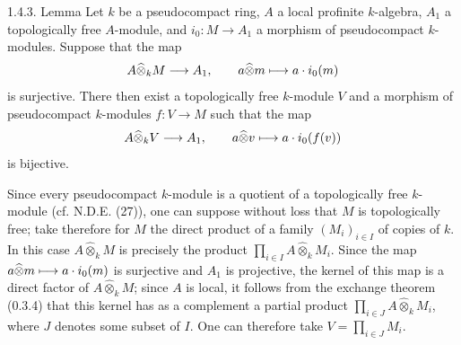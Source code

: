 \begin{enonce}{1.4.3. Lemma}{}\label{VIIB.1.4.3}
Let $k$ be a pseudocompact ring, $A$ a local profinite $k$-algebra, $A_1$ a topologically free $A$-module, and $i_0:M\to A_1$ a morphism of pseudocompact $k$-modules. Suppose that the map
\[
A\widehat\otimes_k M\longrightarrow A_1,\qquad a\widehat\otimes m\longmapsto a\cdot i_0(m)
\]
is surjective. There then exist a topologically free $k$-module $V$ and a morphism of pseudocompact $k$-modules $f:V\to M$ such that the map
\[
A\widehat\otimes_k V\longrightarrow A_1,\qquad a\widehat\otimes v\longmapsto a\cdot i_0(f(v))
\]
is bijective.
\end{enonce}
Since every pseudocompact $k$-module is a quotient of a topologically free $k$-module (cf. N.D.E. (27)), one can suppose without loss that $M$ is topologically free; take therefore for $M$ the direct product of a family $(M_i)_{i\in I}$ of copies of $k$. In this case $A\widehat\otimes_k M$ is precisely the product $\prod_{i\in I}A\widehat\otimes_k M_i$. Since the map $a\widehat\otimes m\longmapsto a\cdot i_0(m)$ is surjective and $A_1$ is projective, the kernel of this map is a direct factor of $A\widehat\otimes_k M$; since $A$ is local, it follows from the exchange theorem (0.3.4) that this kernel has as a complement a partial product $\prod_{i\in J}A\widehat\otimes_k M_i$, where $J$ denotes some subset of $I$. One can therefore take $V=\prod_{i\in J}M_i$.

